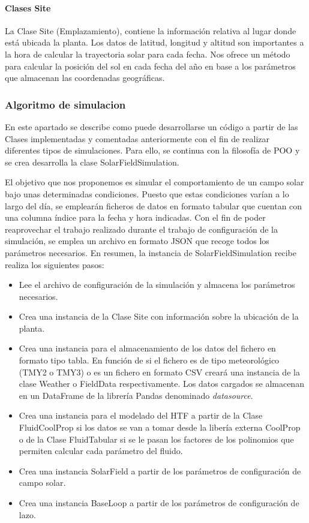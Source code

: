 \hypertarget{clases-site}{%
\paragraph{Clases Site}\label{clases-site}}

La Clase Site (Emplazamiento), contiene la información relativa al lugar
donde está ubicada la planta. Los datos de latitud, longitud y altitud
son importantes a la hora de calcular la trayectoria solar para cada
fecha. Nos ofrece un método para calcular la posición del sol en cada
fecha del año en base a los parámetros que almacenan las coordenadas
geográficas.

\hypertarget{algoritmo-de-simulacion}{%
\subsubsection{Algoritmo de simulacion}\label{algoritmo-de-simulacion}}

En este apartado se describe como puede desarrollarse un código a partir
de las Clases implementadas y comentadas anteriormente con el fin de
realizar diferentes tipos de simulaciones. Para ello, se continua con la
filosofía de POO y se crea desarrolla la clase SolarFieldSimulation.

El objetivo que nos proponemos es simular el comportamiento de un campo
solar bajo unas determinadas condiciones. Puesto que estas condiciones
varían a lo largo del día, se emplearán ficheros de datos en formato
tabular que cuentan con una columna índice para la fecha y hora
indicadas. Con el fin de poder reaprovechar el trabajo realizado durante
el trabajo de configuración de la simulación, se emplea un archivo en
formato JSON que recoge todos los parámetros necesarios. En resumen, la
instancia de SolarFieldSimulation recibe realiza los siguientes pasos:

\begin{itemize}
\tightlist
\item
  Lee el archivo de configuración de la simulación y almacena los
  parámetros necesarios.
\item
  Crea una instancia de la Clase Site con información sobre la ubicación
  de la planta.
\item
  Crea una instancia para el almacenamiento de los datos del fichero en
  formato tipo tabla. En función de si el fichero es de tipo
  meteorológico (TMY2 o TMY3) o es un fichero en formato CSV creará una
  instancia de la clase Weather o FieldData respectivamente. Los datos
  cargados se almacenan en un DataFrame de la librería Pandas denominado
  \emph{datasource}.
\item
  Crea una instancia para el modelado del HTF a partir de la Clase
  FluidCoolProp si los datos se van a tomar desde la libería externa
  CoolProp o de la Clase FluidTabular si se le pasan los factores de los
  polinomios que permiten calcular cada parámetro del fluido.
\item
  Crea una instancia SolarField a partir de los parámetros de
  configuración de campo solar.
\item
  Crea una instancia BaseLoop a partir de los parámetros de
  configuración de lazo.
\end{itemize}

